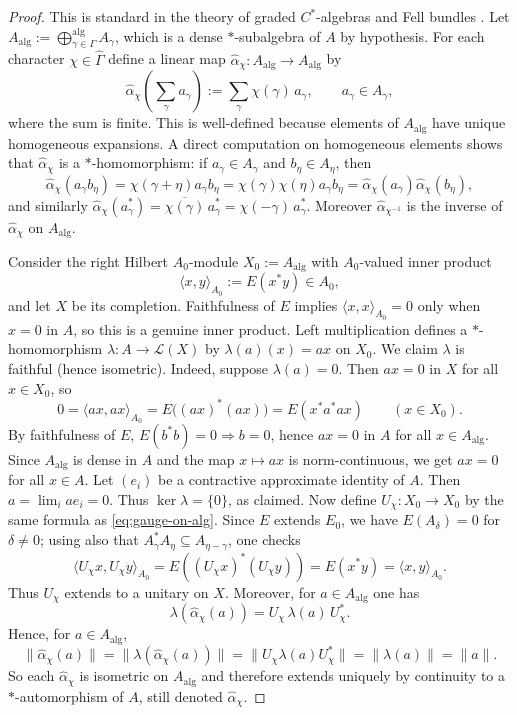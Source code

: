 \documentclass[11pt]{amsart}
\theoremstyle{plain}
\theoremstyle{definition}
\theoremstyle{remark}
\begin{document}
\begin{proof} This is standard in the theory of graded $C^*$-algebras and Fell bundles \cite{Exel}. Let $A_{\mathrm{alg}}:=\bigoplus_{\gamma\in\Gamma}^{\mathrm{alg}} A_\gamma$, which is a dense $*$-subalgebra of $A$ by hypothesis. For each character $\chi\in\widehat\Gamma$ define a linear map $\widehat\alpha_\chi:A_{\mathrm{alg}}\to A_{\mathrm{alg}}$ by
\begin{equation}\label{eq:gauge-on-alg}
\widehat\alpha_\chi\!\left(\sum_{\gamma} a_\gamma\right):=\sum_{\gamma} \chi(\gamma)\,a_\gamma,
\qquad a_\gamma\in A_\gamma,
\end{equation}
where the sum is finite. This is well-defined because elements of $A_{\mathrm{alg}}$ have unique homogeneous expansions.
A direct computation on homogeneous elements shows that $\widehat\alpha_\chi$ is a $*$-homomorphism:
if $a_\gamma\in A_\gamma$ and $b_\eta\in A_\eta$, then
\[
\widehat\alpha_\chi(a_\gamma b_\eta)=\chi(\gamma+\eta)a_\gamma b_\eta
=\chi(\gamma)\chi(\eta)a_\gamma b_\eta=\widehat\alpha_\chi(a_\gamma)\widehat\alpha_\chi(b_\eta),
\]
and similarly $\widehat\alpha_\chi(a_\gamma^*)=\overline{\chi(\gamma)}\,a_\gamma^*=\chi(-\gamma)\,a_\gamma^*$.
Moreover $\widehat\alpha_{\chi^{-1}}$ is the inverse of $\widehat\alpha_\chi$ on $A_{\mathrm{alg}}$.

Consider the right Hilbert $A_0$-module $X_0:=A_{\mathrm{alg}}$ with $A_0$-valued inner product
\[
\langle x,y\rangle_{A_0}:=E(x^*y)\in A_0,
\]
and let $X$ be its completion. Faithfulness of $E$ implies $\langle x,x\rangle_{A_0}=0$ only when $x=0$ in $A$,
so this is a genuine inner product.
Left multiplication defines a $*$-homomorphism $\lambda:A\to\mathcal{L}(X)$ by $\lambda(a)(x)=ax$ on $X_0$.
We claim $\lambda$ is faithful (hence isometric).
Indeed, suppose $\lambda(a)=0$. Then $ax=0$ in $X$ for all $x\in X_0$, so
\[
0=\langle ax,ax\rangle_{A_0}=E\big((ax)^*(ax)\big)=E(x^*a^*a x)\qquad(x\in X_0).
\]
By faithfulness of $E$, $E(b^*b)=0\Rightarrow b=0$, hence $ax=0$ in $A$ for all $x\in A_{\mathrm{alg}}$.
Since $A_{\mathrm{alg}}$ is dense in $A$ and the map $x\mapsto ax$ is norm-continuous, we get $ax=0$ for all $x\in A$.
Let $(e_i)$ be a contractive approximate identity of $A$. Then $a=\lim_i a e_i=0$.
Thus $\ker\lambda=\{0\}$, as claimed.
Now define $U_\chi:X_0\to X_0$ by the same formula as \eqref{eq:gauge-on-alg}.
Since $E$ extends $E_0$, we have $E(A_\delta)=0$ for $\delta\neq 0$; using also that $A_\gamma^*A_\eta\subseteq A_{\eta-\gamma}$, one checks
\[
\langle U_\chi x, U_\chi y\rangle_{A_0}
=E\!\left((U_\chi x)^*(U_\chi y)\right)
=E(x^*y)
=\langle x,y\rangle_{A_0}.
\]
Thus $U_\chi$ extends to a unitary on $X$.
Moreover, for $a\in A_{\mathrm{alg}}$ one has
\[
\lambda(\widehat\alpha_\chi(a))=U_\chi\,\lambda(a)\,U_\chi^*.
\]
Hence, for $a\in A_{\mathrm{alg}}$,
\[
\|\widehat\alpha_\chi(a)\|
=\|\lambda(\widehat\alpha_\chi(a))\|
=\|U_\chi\lambda(a)U_\chi^*\|
=\|\lambda(a)\|
=\|a\|.
\]
So each $\widehat\alpha_\chi$ is isometric on $A_{\mathrm{alg}}$ and therefore extends uniquely by continuity to a
$*$-automorphism of $A$, still denoted $\widehat\alpha_\chi$.


\end{proof}
\end{document}
